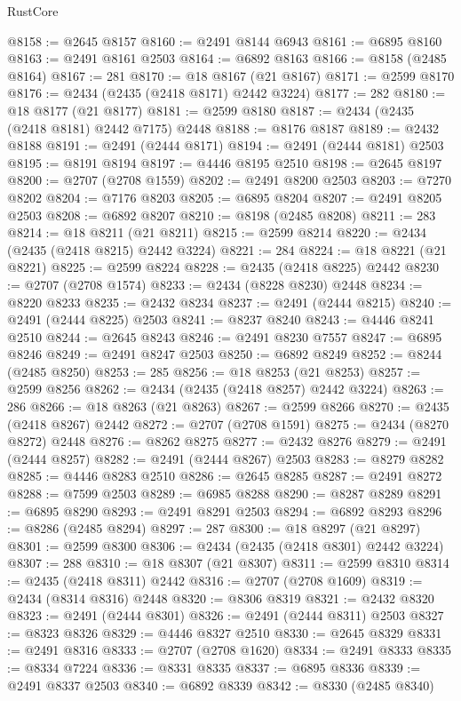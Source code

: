 \begin{lexlean}{RustCore}
\begin{coremodule}
@8158 := @2645 @8157
@8160 := @2491 @8144 @6943
@8161 := @6895 @8160
@8163 := @2491 @8161 @2503
@8164 := @6892 @8163
@8166 := @8158 (@2485 @8164)
@8167 := 281
@8170 := @18 @8167 (@21 @8167)
@8171 := @2599 @8170
@8176 := @2434 (@2435 (@2418 @8171) @2442 @3224)
@8177 := 282
@8180 := @18 @8177 (@21 @8177)
@8181 := @2599 @8180
@8187 := @2434 (@2435 (@2418 @8181) @2442 @7175) @2448
@8188 := @8176 @8187
@8189 := @2432 @8188
@8191 := @2491 (@2444 @8171)
@8194 := @2491 (@2444 @8181) @2503
@8195 := @8191 @8194
@8197 := @4446 @8195 @2510
@8198 := @2645 @8197
@8200 := @2707 (@2708 @1559)
@8202 := @2491 @8200 @2503
@8203 := @7270 @8202
@8204 := @7176 @8203
@8205 := @6895 @8204
@8207 := @2491 @8205 @2503
@8208 := @6892 @8207
@8210 := @8198 (@2485 @8208)
@8211 := 283
@8214 := @18 @8211 (@21 @8211)
@8215 := @2599 @8214
@8220 := @2434 (@2435 (@2418 @8215) @2442 @3224)
@8221 := 284
@8224 := @18 @8221 (@21 @8221)
@8225 := @2599 @8224
@8228 := @2435 (@2418 @8225) @2442
@8230 := @2707 (@2708 @1574)
@8233 := @2434 (@8228 @8230) @2448
@8234 := @8220 @8233
@8235 := @2432 @8234
@8237 := @2491 (@2444 @8215)
@8240 := @2491 (@2444 @8225) @2503
@8241 := @8237 @8240
@8243 := @4446 @8241 @2510
@8244 := @2645 @8243
@8246 := @2491 @8230 @7557
@8247 := @6895 @8246
@8249 := @2491 @8247 @2503
@8250 := @6892 @8249
@8252 := @8244 (@2485 @8250)
@8253 := 285
@8256 := @18 @8253 (@21 @8253)
@8257 := @2599 @8256
@8262 := @2434 (@2435 (@2418 @8257) @2442 @3224)
@8263 := 286
@8266 := @18 @8263 (@21 @8263)
@8267 := @2599 @8266
@8270 := @2435 (@2418 @8267) @2442
@8272 := @2707 (@2708 @1591)
@8275 := @2434 (@8270 @8272) @2448
@8276 := @8262 @8275
@8277 := @2432 @8276
@8279 := @2491 (@2444 @8257)
@8282 := @2491 (@2444 @8267) @2503
@8283 := @8279 @8282
@8285 := @4446 @8283 @2510
@8286 := @2645 @8285
@8287 := @2491 @8272
@8288 := @7599 @2503
@8289 := @6985 @8288
@8290 := @8287 @8289
@8291 := @6895 @8290
@8293 := @2491 @8291 @2503
@8294 := @6892 @8293
@8296 := @8286 (@2485 @8294)
@8297 := 287
@8300 := @18 @8297 (@21 @8297)
@8301 := @2599 @8300
@8306 := @2434 (@2435 (@2418 @8301) @2442 @3224)
@8307 := 288
@8310 := @18 @8307 (@21 @8307)
@8311 := @2599 @8310
@8314 := @2435 (@2418 @8311) @2442
@8316 := @2707 (@2708 @1609)
@8319 := @2434 (@8314 @8316) @2448
@8320 := @8306 @8319
@8321 := @2432 @8320
@8323 := @2491 (@2444 @8301)
@8326 := @2491 (@2444 @8311) @2503
@8327 := @8323 @8326
@8329 := @4446 @8327 @2510
@8330 := @2645 @8329
@8331 := @2491 @8316
@8333 := @2707 (@2708 @1620)
@8334 := @2491 @8333
@8335 := @8334 @7224
@8336 := @8331 @8335
@8337 := @6895 @8336
@8339 := @2491 @8337 @2503
@8340 := @6892 @8339
@8342 := @8330 (@2485 @8340)

\end{coremodule}
\end{lexlean}
